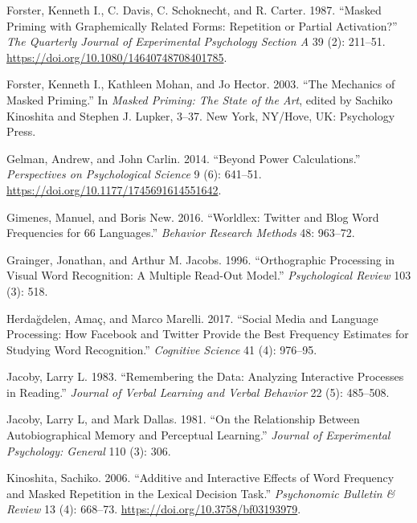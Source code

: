 \documentclass[
]{interact}
\newlength{\cslhangindent}
\newenvironment{CSLReferences}[2] %
 {\begin{list}{}{%
  \setlength{\itemindent}{0pt}
  \setlength{\leftmargin}{0pt}
  \setlength{\parsep}{0pt}
  \ifodd #1
   \setlength{\leftmargin}{\cslhangindent}
   \setlength{\itemindent}{-1\cslhangindent}
  \fi
  \setlength{\itemsep}{#2\baselineskip}}}
 {\end{list}}
\begin{document}
\begin{CSLReferences}{1}{0}
Forster, Kenneth I., C. Davis, C. Schoknecht, and R. Carter. 1987.
{``Masked Priming with Graphemically Related Forms: Repetition or
Partial Activation?''} \emph{The Quarterly Journal of Experimental
Psychology Section A} 39 (2): 211--51.
\url{https://doi.org/10.1080/14640748708401785}.

Forster, Kenneth I., Kathleen Mohan, and Jo Hector. 2003. {``The
Mechanics of Masked Priming.''} In \emph{Masked Priming: The State of
the Art}, edited by Sachiko Kinoshita and Stephen J. Lupker, 3--37. New
York, NY/Hove, UK: Psychology Press.

Gelman, Andrew, and John Carlin. 2014. {``Beyond Power Calculations.''}
\emph{Perspectives on Psychological Science} 9 (6): 641--51.
\url{https://doi.org/10.1177/1745691614551642}.

Gimenes, Manuel, and Boris New. 2016. {``Worldlex: Twitter and Blog Word
Frequencies for 66 Languages.''} \emph{Behavior Research Methods} 48:
963--72.

Grainger, Jonathan, and Arthur M. Jacobs. 1996. {``Orthographic
Processing in Visual Word Recognition: A Multiple Read-Out Model.''}
\emph{Psychological Review} 103 (3): 518.

Herdağdelen, Amaç, and Marco Marelli. 2017. {``Social Media and Language
Processing: How Facebook and Twitter Provide the Best Frequency
Estimates for Studying Word Recognition.''} \emph{Cognitive Science} 41
(4): 976--95.

Jacoby, Larry L. 1983. {``Remembering the Data: Analyzing Interactive
Processes in Reading.''} \emph{Journal of Verbal Learning and Verbal
Behavior} 22 (5): 485--508.

Jacoby, Larry L, and Mark Dallas. 1981. {``On the Relationship Between
Autobiographical Memory and Perceptual Learning.''} \emph{Journal of
Experimental Psychology: General} 110 (3): 306.

Kinoshita, Sachiko. 2006. {``Additive and Interactive Effects of Word
Frequency and Masked Repetition in the Lexical Decision Task.''}
\emph{Psychonomic Bulletin \& Review} 13 (4): 668--73.
\url{https://doi.org/10.3758/bf03193979}.


\end{CSLReferences}
\end{document}
